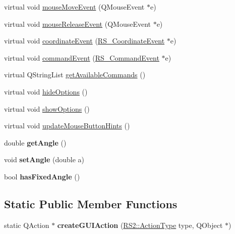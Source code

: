 \begin{DoxyCompactItemize}
\item 
virtual void \hyperlink{classRS__ActionDimLinear_aa0d035f612ca4b0c02412b34c4dea445}{mouse\-Move\-Event} (Q\-Mouse\-Event $\ast$e)
\item 
virtual void \hyperlink{classRS__ActionDimLinear_a7b9382d41a4a5cf4fcb5e8f523628f1b}{mouse\-Release\-Event} (Q\-Mouse\-Event $\ast$e)
\item 
virtual void \hyperlink{classRS__ActionDimLinear_a18b0017e76e9a30ac88919b5ba331442}{coordinate\-Event} (\hyperlink{classRS__CoordinateEvent}{R\-S\-\_\-\-Coordinate\-Event} $\ast$e)
\item 
virtual void \hyperlink{classRS__ActionDimLinear_aa90cfed1454b7597cf0fcac1d601f279}{command\-Event} (\hyperlink{classRS__CommandEvent}{R\-S\-\_\-\-Command\-Event} $\ast$e)
\item 
virtual Q\-String\-List \hyperlink{classRS__ActionDimLinear_ab273139ec72fe946b60764586aa0b6b5}{get\-Available\-Commands} ()
\item 
virtual void \hyperlink{classRS__ActionDimLinear_aaa11df2e4885e08e3e320815e2591a2d}{hide\-Options} ()
\item 
virtual void \hyperlink{classRS__ActionDimLinear_a8f67a1d2810b51e966bc1ea51c23b639}{show\-Options} ()
\item 
virtual void \hyperlink{classRS__ActionDimLinear_a5afc5423f7f542ab10c3ecb561165d8a}{update\-Mouse\-Button\-Hints} ()
\item 
\hypertarget{classRS__ActionDimLinear_a62f36e9d28f6b8ccfb793d927d634de5}{double {\bfseries get\-Angle} ()}\label{classRS__ActionDimLinear_a62f36e9d28f6b8ccfb793d927d634de5}

\item 
\hypertarget{classRS__ActionDimLinear_ad8fffe39b0b1aaf44cf5fe6c9926d880}{void {\bfseries set\-Angle} (double a)}\label{classRS__ActionDimLinear_ad8fffe39b0b1aaf44cf5fe6c9926d880}

\item 
\hypertarget{classRS__ActionDimLinear_a74932a9e08a960738ea782ac12bcc74e}{bool {\bfseries has\-Fixed\-Angle} ()}\label{classRS__ActionDimLinear_a74932a9e08a960738ea782ac12bcc74e}

\end{DoxyCompactItemize}
\subsection*{Static Public Member Functions}
\begin{DoxyCompactItemize}
\item 
\hypertarget{classRS__ActionDimLinear_a5612e5e9833be03ec12286c2b925505b}{static Q\-Action $\ast$ {\bfseries create\-G\-U\-I\-Action} (\hyperlink{classRS2_afe3523e0bc41fd637b892321cfc4b9d7}{R\-S2\-::\-Action\-Type} type, Q\-Object $\ast$)}\label{classRS__ActionDimLinear_a5612e5e9833be03ec12286c2b925505b}

\end{DoxyCompactItemize}
